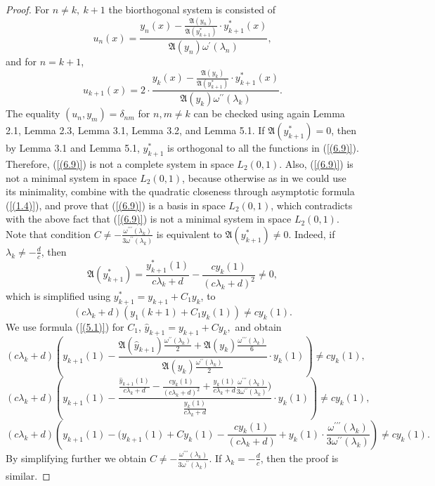 \documentclass[10pt,a4paper]{amsart}
\numberwithin{equation}{section}
\begin{document}
\begin{proof} For $n \ne k,\ k+1$ the biorthogonal system is consisted of
\begin{equation}
u_n(x)=\frac{y_n(x)-\frac{\mathfrak{A}(y_{n})}{\mathfrak{A}(y_{k+1}^{*})}\cdot y^*_{k+1}(x)}{ \mathfrak{A}(y_{n})\omega^\prime(\lambda_n)}
, \label{(6.10)}
\end{equation}
and for $n = k+1$,
\begin{equation}
u_{k+1}(x)=2\cdot\frac{y_{k}(x)-\frac{\mathfrak{A}(y_{k})}{\mathfrak{A}(y_{k+1}^{*})}\cdot y^*_{k+1}(x)}{ \mathfrak{A}(y_k)\omega^{\prime\prime}(\lambda_k)}
. \label{(6.11)}
\end{equation}
The equality $(u_n, y_m) = \delta_{nm}$ for $ n,m\neq k$ can be checked using again Lemma 2.1, Lemma 2.3, Lemma 3.1, Lemma 3.2, and Lemma 5.1.
If $\mathfrak{A}(y_{k+1}^{*}) = 0$, then by Lemma 3.1 and Lemma 5.1, $y_{k+1}^{*}$ is orthogonal to 
all the functions in (\ref{(6.9)}). Therefore, (\ref{(6.9)}) is not a complete system in space $L_{2}(0,1)$. Also, (\ref{(6.9)}) is not a minimal system in space $L_{2}(0,1)$, because otherwise as in \cite{aliyev4} we could use its minimality, combine with the quadratic closeness through asymptotic formula (\ref{(1.4)}), and prove that (\ref{(6.9)}) is a basis in space $L_{2}(0,1)$, which contradicts with the above fact that  (\ref{(6.9)}) is not a minimal system in space $L_{2}(0,1)$.
Note that condition $C\neq-\frac{\omega^{\prime\prime\prime}(\lambda_k)}{3\omega^{\prime\prime}(\lambda_k)}$ is equivalent to $\mathfrak{A}(y_{k+1}^{*})\ne 0$. Indeed, if $\lambda_k\neq-\frac{d}{c}$, then
\begin{equation}
 \mathfrak{A}(y^{*}_{k+1}) =
\frac{y^{*}_{k + 1}(1)}{c\lambda_{k}+d} - \frac{cy_{k}(1)}{{(c\lambda_{k}+d)}^{2}}\neq0, 
 \label{(6.11.1)}
\end{equation}
which is simplified using $y_{k+1}^* = y_{k+1} + C_1 y_k$, to
$$({c\lambda_{k}+d})({ y_{1}(k+1) + C_1 y_k(1)})\neq cy_k(1).$$
We use formula (\ref{(5.1)}) for $C_1$, \(
\hat{y}_{k+1} = y_{k+1} + Cy_k,
\) and obtain
$$
({c\lambda_{k}+d})\left( y_{k+1}(1) -\frac{\mathfrak{A}(\hat{y}_{k+1})\frac{\omega^{\prime\prime}(\lambda_k)}{2}+\mathfrak{A}(y_k)\frac{\omega^{\prime\prime\prime}(\lambda_k)}{6}}{\mathfrak{A}(y_k)\frac{\omega^{\prime\prime}(\lambda_k)}{2}}\cdot y_k(1)\right)\neq cy_k(1),$$
$$
({c\lambda_{k}+d})\left( y_{k+1}(1) -\frac{\frac{\hat{y}_{k+1}(1)}{c\lambda_{k}+d} - \frac{cy_{k}(1)}{{(c\lambda_{k}+d)}^{2}}+\frac{{y}_{k}(1)}{c\lambda_{k}+d}\frac{\omega^{\prime\prime\prime}(\lambda_k)}{3\omega^{\prime\prime}(\lambda_k)})}{\frac{{y}_{k}(1)}{c\lambda_{k}+d}}\cdot y_k(1)\right)\neq cy_k(1),$$
$$
({c\lambda_{k}+d})\left( y_{k+1}(1) -(y_{k+1}(1)+Cy_{k}(1)-\frac{cy_{k}(1)}{{(c\lambda_{k}+d)}}+y_{k}(1)\cdot\frac{\omega^{\prime\prime\prime}(\lambda_k)}{3\omega^{\prime\prime}(\lambda_k)}\right)\neq cy_k(1).
$$
By simplifying further we obtain
$C\neq-\frac{\omega^{\prime\prime\prime}(\lambda_k)}{3\omega^{\prime\prime}(\lambda_k)}$.
If $\lambda_k=-\frac{d}{c}$, then the proof is similar.
\end{proof}
\end{document}
